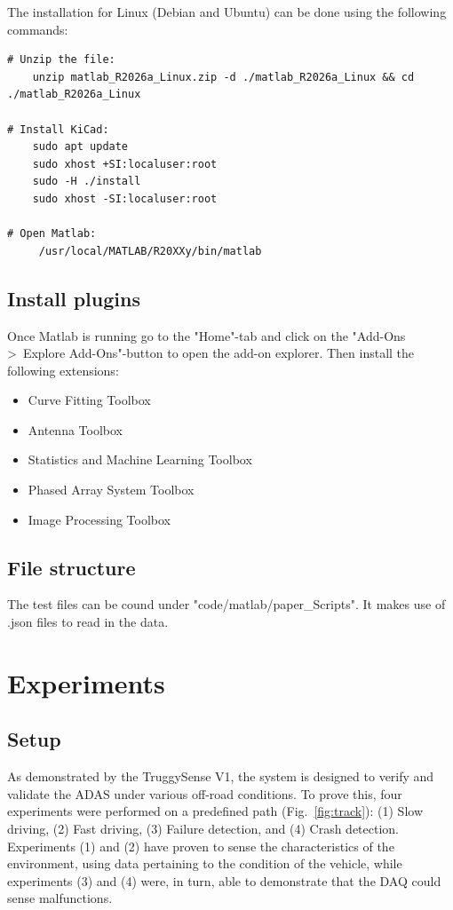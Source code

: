 \documentclass[ti,oneside,10pt]{uantwerpenreport}
\newcommand{\RmLstWS}[0]{\vspace{-6pt}} %
\begin{document}
The installation for Linux (Debian and Ubuntu) can be done using the following commands:
\begin{lstlisting}[style=cmd]
# Unzip the file:
    unzip matlab_R2026a_Linux.zip -d ./matlab_R2026a_Linux && cd ./matlab_R2026a_Linux

# Install KiCad:
    sudo apt update 
    sudo xhost +SI:localuser:root
    sudo -H ./install
    sudo xhost -SI:localuser:root

# Open Matlab:
     /usr/local/MATLAB/R20XXy/bin/matlab
\end{lstlisting}
\RmLstWS
\subsection{Install plugins}
Once Matlab is running go to the "Home"-tab and click on the "Add-Ons \textgreater~Explore Add-Ons"-button to open the add-on explorer.
Then install the following extensions:
\RmLstWS
\begin{itemize}
    \item Curve Fitting Toolbox
    \item Antenna Toolbox
    \item Statistics and Machine Learning Toolbox
    \item Phased Array System Toolbox
    \item Image Processing Toolbox
\end{itemize}
\RmLstWS

\subsection{File structure}
The test files can be cound under "code/matlab/paper_Scripts".
It makes use of .json files to read in the data.
\newpage
\section{Experiments}
\subsection{Setup}
As demonstrated by the TruggySense V1, the system is designed to verify and validate the ADAS under various off-road conditions.
To prove this, four experiments were performed on a predefined path (Fig.~\ref{fig:track}): (1) Slow driving, (2) Fast driving, (3) Failure detection, and (4) Crash detection.
Experiments (1) and (2) have proven to sense the characteristics of the environment, using data pertaining to the condition of the vehicle, while experiments (3) and (4) were, in turn, able to demonstrate that the DAQ could sense malfunctions.
\end{document}
